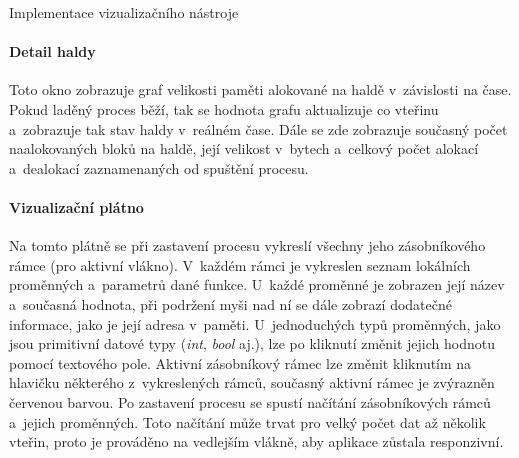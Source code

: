 \documentclass[czech,bachelor,male,python,dept460,hidelinks]{diploma}						%
\begin{document}
\begin{section}{Implementace vizualizačního nástroje}
	\paragraph*{Detail haldy}
		Toto okno zobrazuje graf velikosti paměti alokované na haldě v~závislosti na čase. Pokud laděný proces běží, tak se hodnota grafu aktualizuje co vteřinu
		a~zobrazuje tak stav haldy v~reálném čase. Dále se zde zobrazuje současný počet naalokovaných bloků na haldě, její velikost v~bytech a~celkový počet
		alokací a~dealokací zaznamenaných od spuštění procesu.
	\paragraph*{Vizualizační plátno} Na tomto plátně se při zastavení procesu vykreslí všechny jeho zásobníkového rámce (pro aktivní vlákno). V~každém rámci je
		vykreslen seznam lokálních proměnných a~parametrů dané funkce. U~každé proměnné je zobrazen její název a~současná hodnota, při podržení myši nad ní se dále
		zobrazí dodatečné informace, jako je její adresa v~paměti. U~jednoduchých typů proměnných, jako jsou primitivní datové typy (\textit{int}, \textit{bool}
		aj.), lze po kliknutí změnit jejich hodnotu pomocí textového pole. Aktivní zásobníkový rámec lze změnit kliknutím na hlavičku některého z~vykreslených
		rámců, současný aktivní rámec je zvýrazněn červenou barvou. Po zastavení procesu se spustí načítání zásobníkových
		rámců a~jejich proměnných. Toto načítání může trvat pro velký počet dat až několik vteřin, proto je prováděno na vedlejším vlákně, aby aplikace
		zůstala responzivní.

\end{section}
\end{document}
